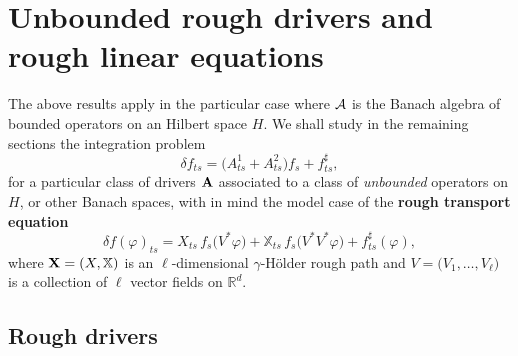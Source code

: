 \documentclass[11pt,a4paper]{amsart}
\newcommand{\RR}{\mathbb{R}}  \newcommand{\CC}{\mathbb{C}}  \newcommand{\LL}{\mathbb{L}}  \newcommand{\WW}{\mathbb{W}}
\newcommand{\bbX}{\mathbb{X}}
\numberwithin{equation}{section} %
\begin{document}
\medskip



\section{Unbounded rough drivers and rough linear equations}
\label{SectionUnboundedRoughDrivers}

The above results apply in the particular case where $\mathcal{A}$ is the Banach algebra of bounded operators on an Hilbert space $H$. We shall study in the remaining sections the integration problem 
\begin{equation}
\label{EqLinearEquationHilbert}
\delta f_{ts} = \Big(A^1_{ts} + A^2_{ts}\Big) f_s +  f^\sharp_{ts},
\end{equation}
for a particular class of drivers $\bf A$ associated to a class of \textit{unbounded} operators on $H$, or other Banach spaces, with in mind the model case of the \textbf{rough transport equation}
$$
\delta f(\varphi)_{ts} = X_{ts}\,f_s\big(V^*\varphi\big) +  \bbX_{ts}\,f_s\big(V^*V^*\varphi\big) + f^\sharp_{ts}(\varphi),
$$
where ${\bfX} = (X,\bbX)$ is an $\ell$-dimensional $\gamma$-H\"older rough path and $V = \big(V_1,\dots,V_\ell\big)$ is a collection of $\ell$ vector fields on $\RR^d$.



\subsection{Rough drivers}
\label{SubsectionRoughDrivers}
\end{document}
